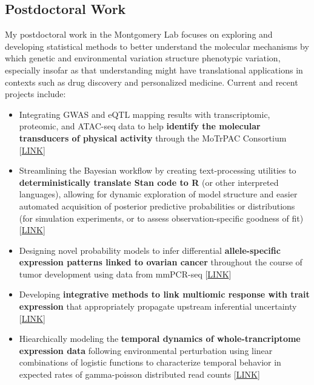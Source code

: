 \documentclass[12pt]{article}
\begin{document}
\subsection{Postdoctoral Work}

My postdoctoral work in the Montgomery Lab focuses on exploring and developing statistical methods to better understand the molecular mechanisms by which genetic and environmental variation structure phenotypic variation, especially insofar as that understanding might have translational applications in contexts such as drug discovery and personalized medicine.  Current and recent projects include:

\begin{itemize}[noitemsep]

\item Integrating GWAS and eQTL mapping results with transcriptomic, proteomic, and ATAC-seq data to help \textbf{identify the molecular transducers of physical activity} through the MoTrPAC Consortium [\href{https://github.com/NikVetr/MoTrPAC\_Complex\_Traits}{LINK}]

\item Streamlining the Bayesian workflow by creating text-processing utilities to \textbf{deterministically translate Stan code to R} (or other interpreted languages), allowing for dynamic exploration of model structure and easier automated acquisition of posterior predictive probabilities or distributions (for simulation experiments, or to assess observation-specific goodness of fit) [\href{ https://github.com/NikVetr/montgomery\_lab/blob/master/parse\_Stan.R }{LINK}]

\item Designing novel probability models to infer differential \textbf{allele-specific expression patterns linked to ovarian cancer} throughout the course of tumor development using data from mmPCR-seq [\href{https://github.com/nsabell/egtex-ase}{LINK}]

\item Developing \textbf{integrative methods to link multiomic response with trait expression} that appropriately propagate upstream inferential uncertainty [\href{https://github.com/NikVetr/papers/blob/main/twas-method/proposed\_TWAS\_method.pdf}{LINK}]

\item Hiearchically modeling the \textbf{temporal dynamics of whole-trancriptome expression data} following environmental perturbation using linear combinations of logistic functions to characterize temporal behavior in expected rates of gamma-poisson distributed read counts [\href{https://github.com/NikVetr/montgomery_lab/blob/61e2ac4b0fea0ee7f5bf31590a40378f0027264a/growth\_and\_decay\_processes.R#L8}{LINK}]


\end{itemize}
\end{document}
